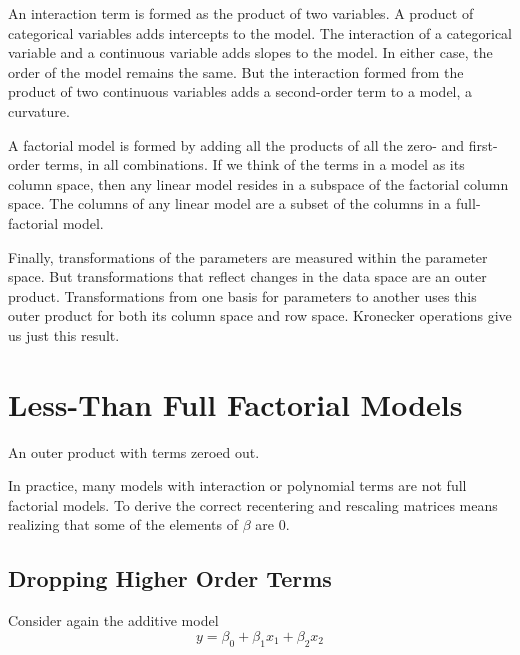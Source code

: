 \documentclass[]{article}
\begin{document}
An interaction term is formed as the product of two variables. A product
of categorical variables adds intercepts to the model. The interaction
of a categorical variable and a continuous variable adds slopes to the
model. In either case, the order of the model remains the same. But the
interaction formed from the product of two continuous variables adds a
second-order term to a model, a curvature.

A factorial model is formed by adding all the products of all the zero-
and first-order terms, in all combinations. If we think of the terms in
a model as its column space, then any linear model resides in a subspace
of the factorial column space. The columns of any linear model are a
subset of the columns in a full-factorial model.

Finally, transformations of the parameters are measured within the
parameter space. But transformations that reflect changes in the data
space are an outer product. Transformations from one basis for
parameters to another uses this outer product for both its column space
and row space. Kronecker operations give us just this result.

\hypertarget{less-than-full-factorial-models}{%
\section{Less-Than Full Factorial
Models}\label{less-than-full-factorial-models}}

An outer product with terms zeroed out.

In practice, many models with interaction or polynomial terms are not
full factorial models. To derive the correct recentering and rescaling
matrices means realizing that some of the elements of \(\beta\) are
\(0\).

\hypertarget{dropping-higher-order-terms}{%
\subsection{Dropping Higher Order
Terms}\label{dropping-higher-order-terms}}

Consider again the additive model
\[y = \beta_0 + \beta_1x_1 + \beta_2x_2\]
\end{document}
